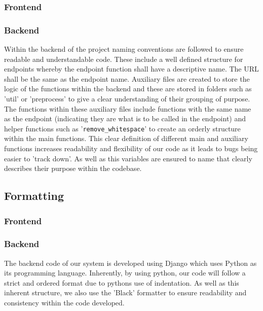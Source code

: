 \documentclass[12pt]{article}
\begin{document}
\subsubsection{Frontend}

\subsubsection{Backend}
Within the backend of the project naming conventions are followed to ensure readable and understandable code. These include a well defined structure for endpoints whereby the endpoint function shall have a descriptive name. The URL shall be the same as the endpoint name. Auxiliary files are created to store the logic of the functions within the backend and these are stored in folders such as 'util' or 'preprocess' to give a clear understanding of their grouping of purpose. The functions within these auxiliary files include functions with the same name as the endpoint (indicating they are what is to be called in the endpoint) and helper functions such as '\texttt{remove\_whitespace}' to create an orderly structure within the main functions. This clear definition of different main and auxiliary functions increases readability and flexibility of our code as it leads to bugs being easier to 'track down'. As well as this variables are ensured to name that clearly describes their purpose within the codebase.

\subsection{Formatting}
\subsubsection{Frontend}

\subsubsection{Backend}
The backend code of our system is developed using Django which uses Python as its programming language. Inherently, by using python, our code will follow a strict and ordered format due to pythons use of indentation. As well as this inherent structure, we also use the 'Black' formatter to ensure readability and consistency within the code developed.
\end{document}
